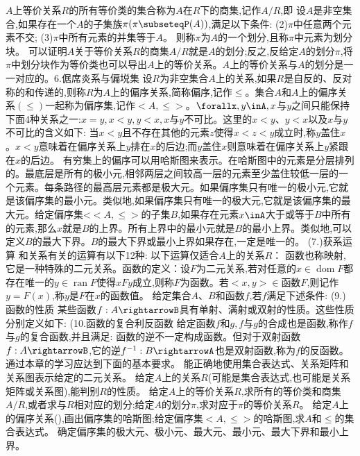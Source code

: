 $A$上等价关系$R$的所有等价类的集合称为$A$在$R$下的商集,记作$A/R$,即
设$A$是非空集合,如果存在一个$A$的子集族$\pi(\pi\subseteqP(A))$,满足以下条件:
(2)$\pi$中任意两个元素不交;
(3)$\pi$中所有元素的并集等于$A$。
则称$\pi$为$A$的一个划分,且称$\pi$中元素为划分块。
可以证明$A$关于等价关系$R$的商集$A/R$就是$A$的划分;反之,反给定$A$的划分$\pi$,将$\pi$中划分块作为等价类也可以导出$A$上的等价关系。$A$上的等价关系与$A$的划分是一一对应的。6.倨席炎系与偏㙂集
设$R$为非空集合$A$上的关系,如果$R$是自反的、反对称的和传递的,则称$R$为$A$上的偏序关系,简称偏序,记作$\leqslant$。集合$A$和$A$上的偏序关系$(\leqslant)$一起称为偏序集,记作$<A,\leqslant>$。$\forallx,y\inA,x$与$y$之间只能保持下面4种关系之一:$x=y,x<y,y<x,x$与$y$不可比。这里的$x<y、y<x$以及$x$与$y$不可比的含义如下:
当$x<y$且不存在其他的元素$z$使得$x<z<y$成立时,称$y$盖住$x$。$x<y$意味着在偏序关系上$y$排在$x$的后边;而$y$盖住$x$则意味着在偏序关系上$y$紧跟在$x$的后边。
有穷集上的偏序可以用哈斯图来表示。在哈斯图中的元素是分层排列的。最底层是所有的极小元,相邻两层之间较高一层的元素至少盖住较低一层的一个元素。每条路径的最高层元素都是极大元。如果偏序集只有唯一的极小元,它就是该偏序集的最小元。类似地,如果偏序集只有唯一的极大元,它就是该偏序集的最大元。给定偏序集<$<A,\leqslant>$的子集$B$,如果存在元素$x\inA$大于或等于$B$中所有的元素,那么$x$就是$B$的上界。所有上界中的最小元就是$B$的最小上界。类似地,可以定义$B$的最大下界。$B$的最大下界或最小上界如果存在,一定是唯一的。
{(7.)获系运算}
和关系有关的运算有以下12种:
以下运算仅适合$A$上的关系$R$：
函数也称映射,它是一种特殊的二元关系。函数的定义：设$F$为二元关系,若对任意的$x\in\operatorname{dom}F$都存在唯一的$y\in\operatorname{ran}F$使得$xFy$成立,则称$F$为函数。若$<x,y>\in$函数$F$,则记作$y=F(x)$,称$y$是$F$在$x$的函数值。
给定集合$A、B$和函数$f$,若$f$满足下述条件:
{(9.)函数的性质}
某些函数$f:A\rightarrowB$具有单射、满射或双射的性质。这些性质分别定义如下:
(10.函数的复合利反函数
给定函数$f$和$g,f$与$g$的合成也是函数,称作$f$与$g$的复合函数,并且满足:
函数的逆不一定构成函数。但对于双射函数$f:A\rightarrowB$,它的逆$f^{-1}:B\rightarrowA$也是双射函数,称为$f$的反函数。
通过本章的学习应达到下面的基本要求。
能正确地使用集合表达式、关系矩阵和关系图表示给定的二元关系。
给定$A$上的关系$R$(可能是集合表达式,也可能是关系矩阵或关系图),能判别$R$的性质。
给定$A$上的等价关系$R$,求所有的等价类和商集$A/R$,或者求与$R$相对应的划分;给定$A$的划分$\pi$,求对应于$\pi$的等价关系$R$。
给定$A$上的偏序关系(),画出偏序集的哈斯图;给定偏序集$<A,\leqslant>$的哈斯图,求$A$和$\leqslant$的集合表达式。
确定偏序集的极大元、极小元、最大元、最小元、最大下界和最小上界。
